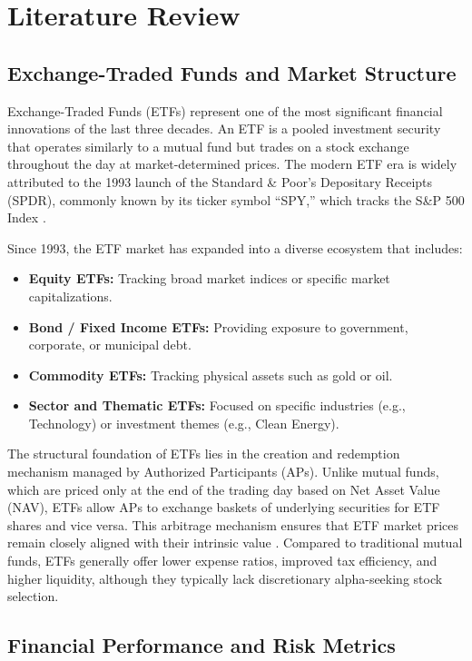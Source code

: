 \chapter{Literature Review}

\section{Exchange-Traded Funds and Market Structure}

Exchange-Traded Funds (ETFs) represent one of the most significant financial innovations of the last three decades. An ETF is a pooled investment security that operates similarly to a mutual fund but trades on a stock exchange throughout the day at market-determined prices. The modern ETF era is widely attributed to the 1993 launch of the Standard \& Poor’s Depositary Receipts (SPDR), commonly known by its ticker symbol ``SPY,'' which tracks the S\&P 500 Index \cite{spy2025}.

Since 1993, the ETF market has expanded into a diverse ecosystem that includes:

\begin{itemize}
    \item \textbf{Equity ETFs:} Tracking broad market indices or specific market capitalizations.
    \item \textbf{Bond / Fixed Income ETFs:} Providing exposure to government, corporate, or municipal debt.
    \item \textbf{Commodity ETFs:} Tracking physical assets such as gold or oil.
    \item \textbf{Sector and Thematic ETFs:} Focused on specific industries (e.g., Technology) or investment themes (e.g., Clean Energy).
\end{itemize}

The structural foundation of ETFs lies in the creation and redemption mechanism managed by Authorized Participants (APs). Unlike mutual funds, which are priced only at the end of the trading day based on Net Asset Value (NAV), ETFs allow APs to exchange baskets of underlying securities for ETF shares and vice versa. This arbitrage mechanism ensures that ETF market prices remain closely aligned with their intrinsic value \cite{chen2025}. Compared to traditional mutual funds, ETFs generally offer lower expense ratios, improved tax efficiency, and higher liquidity, although they typically lack discretionary alpha-seeking stock selection.

\section{Financial Performance and Risk Metrics}

